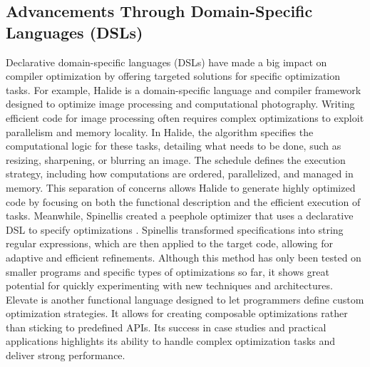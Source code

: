 \subsection{Advancements Through Domain-Specific Languages (DSLs)}
Declarative domain-specific languages (DSLs) have made a big impact on compiler optimization by offering targeted solutions for specific optimization tasks. For example, Halide \cite{Jonathan2018} is a domain-specific language and compiler framework designed to optimize image processing and computational photography. Writing efficient code for image processing often requires complex optimizations to exploit parallelism and memory locality. In Halide, the algorithm specifies the computational logic for these tasks, detailing what needs to be done, such as resizing, sharpening, or blurring an image. The schedule defines the execution strategy, including how computations are ordered, parallelized, and managed in memory. This separation of concerns allows Halide to generate highly optimized code by focusing on both the functional description and the efficient execution of tasks. Meanwhile, Spinellis created a peephole optimizer that uses a declarative DSL to specify optimizations \cite{Spinellis1999}. Spinellis transformed specifications into string regular expressions, which are then applied to the target code, allowing for adaptive and efficient refinements. Although this method has only been tested on smaller programs and specific types of optimizations so far, it shows great potential for quickly experimenting with new techniques and architectures. Elevate \cite{Hagedorn2020} is another functional language designed to let programmers define custom optimization strategies. It allows for creating composable optimizations rather than sticking to predefined APIs. Its success in case studies and practical applications highlights its ability to handle complex optimization tasks and deliver strong performance.


